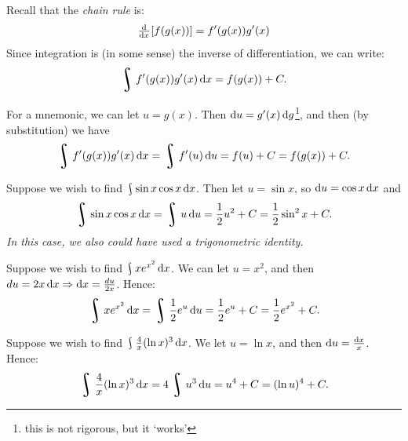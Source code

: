 


Recall that the \textit{chain rule} is:
\begin{displaymath}
  \od{}{x} [f(g(x))] = f'(g(x)) g'(x)
\end{displaymath}
Since integration is (in some sense) the inverse of differentiation, we can write:
\begin{displaymath}
  \rint f'(g(x)) g'(x) \dif{x} = f(g(x)) + C.
\end{displaymath}

For a mnemonic, we can let $ u = g(x) $. Then $ \dif{u} = g'(x) \dif{g} $\footnote{this is not rigorous, but it `works'},
and then (by substitution) we have
\begin{displaymath}
  \rint f'(g(x)) g'(x) \dif{x} = \rint f'(u) \dif{u} = f(u) + C = f(g(x)) + C.
\end{displaymath}

\begin{ex}
  Suppose we wish to find $ \rint \sin x \cos x \dif{x} $. Then let $ u = \sin x $, so $ \dif{u} = \cos x \dif{x} $
  and
  \begin{displaymath}
    \rint \sin x \cos x \dif{x} = \rint u \dif{u} = \frac{1}{2} u^2 + C = \frac{1}{2} \sin^2 x + C.
  \end{displaymath}
  \textit{In this case, we also could have used a trigonometric identity.}
\end{ex}

\begin{ex}
  Suppose we wish to find $ \rint xe^{x^2} \dif{x} $. We can let $ u = x^2 $, and then $ du = 2x \dif{x} \Rightarrow \dif{x} = \frac{du}{2x} $.
  Hence:
  \begin{displaymath}
    \rint xe^{x^2} \dif{x} = \rint \frac{1}{2} e^u \dif{u} = \frac{1}{2} e^u + C = \frac{1}{2}e^{x^2} + C.
  \end{displaymath}
\end{ex}

\begin{ex}
  Suppose we wish to find $ \rint \frac{4}{x} (\ln x)^3 \dif{x} $. We let $ u = \ln x $, and then $ \dif{u} = \frac{\dif{x}}{x} $.
  Hence:
  \begin{displaymath}
    \rint \frac{4}{x} (\ln x)^3 \dif{x} = 4\rint u^3 \dif{u} = u^4 + C = (\ln u)^4 + C.
  \end{displaymath}
\end{ex}

